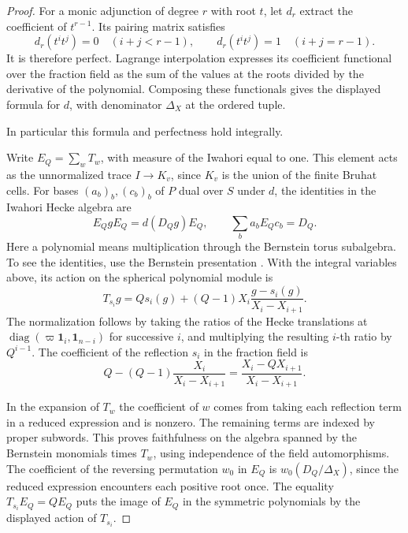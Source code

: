 \begin{proof}
For a monic adjunction of degree \(r\) with root \(t\),
let \(d_r\) extract the coefficient of \(t^{r-1}\).
Its pairing matrix satisfies
\[
             d_r(t^it^j)=0\quad(i+j<r-1),\qquad
             d_r(t^it^j)=1\quad(i+j=r-1).
\] It is therefore
perfect. Lagrange interpolation expresses its coefficient
functional over the fraction field as the sum of the values
at the roots divided by the derivative of the polynomial.
Composing these functionals gives the displayed formula for
\(d\), with denominator \(\Delta_X\) at the ordered tuple.

In particular this formula and perfectness hold integrally.

Write \(E_Q=\sum_w T_w\), with measure of the Iwahori
equal to one. This element acts as the unnormalized trace
\(I\to K_v\), since \(K_v\) is the union of the finite
Bruhat cells. For bases \((a_b)_b,(c_b)_b\) of \(P\) dual
over \(S\) under \(d\), the identities in the Iwahori
Hecke algebra are
\begin{equation}
\label{eq:hecke-transfer-identities}
 E_Q g E_Q=d(D_Qg)E_Q,\qquad
 \sum_b a_b E_Q c_b=D_Q .
\end{equation}
Here a polynomial means multiplication through the
Bernstein torus subalgebra. To see the identities, use
the Bernstein presentation
\cite[Sections 1.5 and 1.15]{haines-kottwitz-prasad}.
With the integral variables above, its action on the
spherical polynomial module is
\[
 T_{s_i}g=Q s_i(g)+(Q-1)X_i\frac{g-s_i(g)}{X_i-X_{i+1}}.
\]
The normalization follows by taking the ratios of the
Hecke translations at
\(\operatorname{diag}(\varpi\mathbf 1_i,\mathbf 1_{n-i})\)
for successive \(i\), and multiplying the resulting
\(i\)-th ratio by \(Q^{i-1}\). The coefficient of the reflection \(s_i\) in the fraction field is
\[
       Q-(Q-1)\frac{X_i}{X_i-X_{i+1}}
                  =\frac{X_i-QX_{i+1}}{X_i-X_{i+1}}.
\]

In the expansion of
\(T_w\) the coefficient of \(w\) comes from taking each
reflection term in a reduced expression and is nonzero.
The remaining terms are indexed by proper subwords.
This proves faithfulness on the algebra spanned by the
Bernstein monomials times \(T_w\), using independence of
the field automorphisms. The coefficient of the reversing
permutation \(w_0\) in \(E_Q\) is
\(w_0(D_Q/\Delta_X)\), since the reduced expression
encounters each positive root once. The equality
\(T_{s_i}E_Q=Q E_Q\) puts the image of \(E_Q\) in the
symmetric polynomials by the displayed action of \(T_{s_i}\).


\end{proof}
